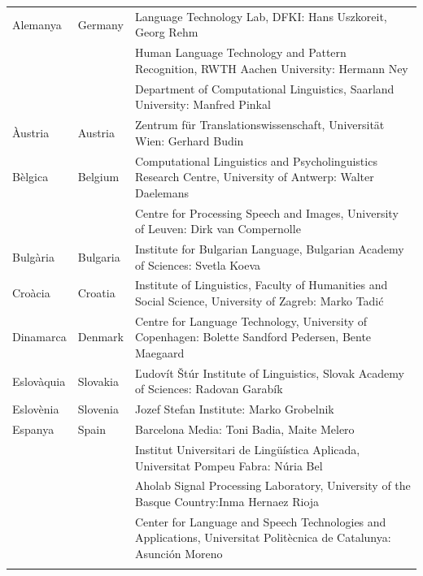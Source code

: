\begin{longtable}{@{}llp{114mm}@{}}
  Alemanya & \textcolor{grey1}{Germany} & Language Technology Lab, DFKI: Hans Uszkoreit, Georg Rehm\\ \addlinespace
  & & Human Language Technology and Pattern Recognition, RWTH Aachen University: Hermann Ney \\ \addlinespace
  & & Department of Computational Linguistics, Saarland University: Manfred Pinkal\\ \addlinespace 
  Àustria & \textcolor{grey1}{Austria} & Zentrum für Translationswissenschaft, Universität Wien: Gerhard Budin\\ \addlinespace 
  Bèlgica & \textcolor{grey1}{Belgium} & Computational Linguistics and Psycholinguistics Research Centre, University of Antwerp: Walter Daelemans\\ \addlinespace
  & & Centre for Processing Speech and Images, University of Leuven: Dirk van Compernolle \\ \addlinespace
  Bulgària & \textcolor{grey1}{Bulgaria} & Institute for Bulgarian Language, Bulgarian Academy of Sciences: Svetla Koeva \\ \addlinespace
  Croàcia & \textcolor{grey1}{Croatia} & Institute of Linguistics, Faculty of Humanities and Social Science, University of Zagreb: Marko Tadić \\ \addlinespace
  Dinamarca &  \textcolor{grey1}{Denmark} & Centre for Language Technology, University of Copenhagen: \newline Bolette Sandford Pedersen, Bente Maegaard\\ \addlinespace
  Eslovàquia & \textcolor{grey1}{Slovakia} & Ľudovít Štúr Institute of Linguistics, Slovak Academy of Sciences: Radovan Garabík \\ \addlinespace 
  Eslovènia & \textcolor{grey1}{Slovenia} & Jozef Stefan Institute: Marko Grobelnik \\ \addlinespace 
  Espanya & \textcolor{grey1}{Spain} & Barcelona Media: Toni Badia, Maite Melero \\ \addlinespace 
  & & Institut Universitari de Lingüística Aplicada, Universitat Pompeu Fabra: Núria Bel \\ \addlinespace 
  & & Aholab Signal Processing Laboratory, University of the Basque Country:\newline Inma Hernaez Rioja \\ \addlinespace 
  & & Center for Language and Speech Technologies and Applications, Universitat Politècnica de Catalunya:  Asunción Moreno \\ \addlinespace 

\end{longtable}
